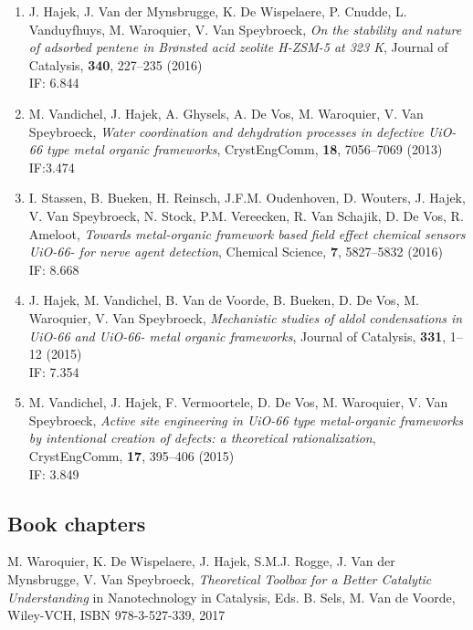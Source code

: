\begin{enumerate}
\item 

J. Hajek, J. Van der Mynsbrugge, K. De Wispelaere, P. Cnudde, L. Vanduyfhuys, M.
Waroquier, V. Van Speybroeck, \textit{On the stability and nature of adsorbed
pentene in Br\o{}nsted acid zeolite H-ZSM-5 at 323 K}, Journal of Catalysis,
\textbf{340}, 227--235 (2016)\\ IF: 6.844

\item 

M. Vandichel, J. Hajek, A. Ghysels, A. De Vos, M. Waroquier, V. Van Speybroeck,
\textit{Water coordination and dehydration processes in defective UiO-66 type
metal organic frameworks}, CrystEngComm, \textbf{18}, 7056--7069 (2013) \\
IF:3.474
\item 

I. Stassen, B. Bueken, H. Reinsch, J.F.M. Oudenhoven, D. Wouters, J.
Hajek, V. Van Speybroeck, N. Stock, P.M. Vereecken, R. Van Schajik, D. De Vos,
R. Ameloot, \textit{Towards metal-organic framework based field effect chemical sensors
UiO-66- for nerve agent detection}, Chemical Science, \textbf{7},
5827--5832 (2016)\\
IF: 8.668

\item 

J. Hajek, M. Vandichel, B. Van de Voorde, B. Bueken, D. De Vos, M.
Waroquier, V. Van Speybroeck, \textit{Mechanistic studies of aldol condensations
in UiO-66 and UiO-66- metal organic frameworks}, Journal of Catalysis,
\textbf{331}, 1--12 (2015)\\ IF: 7.354

\item 

M. Vandichel, J. Hajek, F. Vermoortele, D. De Vos, M. Waroquier, V.
Van Speybroeck, \textit{Active site engineering in UiO-66 type metal-organic
frameworks by intentional creation of defects: a theoretical rationalization},
CrystEngComm, \textbf{17}, 395--406 (2015)\\ IF: 3.849

\end{enumerate}

\subsection*{Book chapters}
M. Waroquier, K. De Wispelaere, J. Hajek, S.M.J. Rogge, J. Van der
Mynsbrugge, V. Van Speybroeck, \textit{Theoretical Toolbox for a Better Catalytic
Understanding} in Nanotechnology in Catalysis, Eds. B. Sels, M. Van de Voorde,
Wiley-VCH, ISBN 978-3-527-339, 2017 

